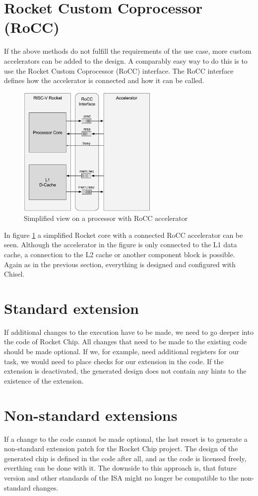 \section{Rocket Custom Coprocessor (RoCC)}
If the above methods do not fulfill the requirements
of the use case, more custom accelerators can be added to
the design. A comparably easy way to do this is to use
the Rocket Custom Coprocessor (RoCC) interface.
The RoCC interface defines how the accelerator is
connected and how it can be called.
\begin{figure}
    \centering
    \includegraphics[width=0.6\textwidth]{figures/rocket_chip_rocc_simple}
    \caption{Simplified view on a processor with RoCC accelerator \cite[p.~6]{rocket_chip_rocc_presentation}}
    \label{fig:rocket_chip_rocc_simple}
\end{figure}
In figure \ref{fig:rocket_chip_rocc_simple} a simplified Rocket
core with a connected RoCC accelerator can be seen.
Although the accelerator in the figure is only connected
to the L1 data cache, a connection to the L2 cache or
another component block is possible.
Again as in the previous section, everything is designed
and configured with Chisel.

\section{Standard extension}
If additional changes to the execution have to
be made, we need to go deeper into
the code of Rocket Chip.
All changes that need to be made to the existing
code should be made optional.
If we, for example, need additional registers
for our task, we would need to place
checks for our extension in the code.
If the extension is deactivated, the generated
design does not contain any hints to the
existence of the extension.

\section{Non-standard extensions}
If a change to the code cannot be made optional,
the last resort is to generate a non-standard
extension patch for the Rocket Chip project.
The design of the generated chip is defined in
the code after all, and as the code is licensed
freely, everthing can be done with it.
The downside to this approach is, that future
version and other standards of the ISA might no
longer be compatible to the non-standard changes.